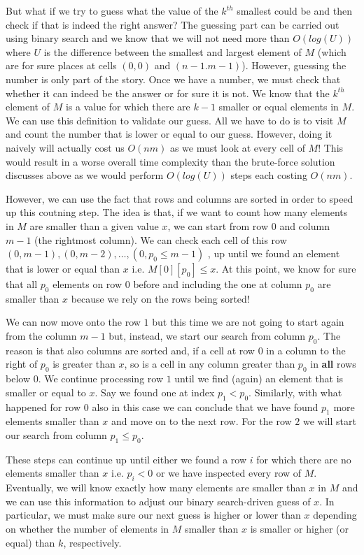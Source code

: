 But what if we try to guess what the value of the $k^{th}$ smallest could be and then check if that is indeed the right answer? The guessing part can be carried out using binary search and we know that we will not need more than $O(log(U))$ where $U$ is the difference between the smallest and largest element of $M$ (which are for sure places at cells $(0,0)$ and $(n-1.m-1)$).
However, guessing the number is only part of the story. Once we have a number, we must check that whether it can indeed be the answer or for sure it is not. 
We know that the $k^{th}$ element of $M$ is a value for which there are $k-1$ smaller or equal elements in $M$. We can use this definition to validate our guess. All we have to do is to visit $M$ and count the number that is lower or equal to our guess. However, doing it naively will actually cost us $O(nm)$ as we must look at every cell of $M$! This would result in a worse overall time complexity than the brute-force solution discusses above as we would perform $O(log(U))$ steps each costing $O(nm)$.

However, we can use the fact that rows and columns are sorted in order to speed up this coutning step.
The idea is that, if we want to count how many elements in $M$ are smaller than a given value $x$, we can start from row $0$ and column $m-1$ (the rightmost column). We can check each cell of this row $(0,m-1),(0,m-2),\ldots,(0,p_0 \leq m-1)$ , up until we found an element that is lower or equal than $x$ i.e. $M[0][p_0] \leq x$. At this point, we know for sure that all $p_0$ elements on row $0$ before and including the one at column $p_0$  are smaller than $x$ because we rely on the rows being sorted!

We can now move onto the row $1$ but this time we are not going to start again from the column $m-1$ but, instead, we start our search from column $p_0$.
 The reason is that also columns are sorted and, if a cell at row $0$ in a column to the right of $p_0$ is greater than $x$, so is a cell in any column greater than $p_0$ in \textbf{all} rows below $0$.
We continue processing row $1$ until we find (again) an element that is smaller or equal to $x$. Say we found one at index $p_1 < p_0$. Similarly, with what happened for row $0$ also in this case we can conclude that we have found $p_1$ more elements smaller than $x$ and move on to the next row. 
For the row $2$ we will start our search from column $p_1 \leq p_0$. 

These steps can continue up until either we found a row $i$ for which there are no elements smaller than $x$ i.e. $p_i < 0$ or we have inspected every row of $M$.
Eventually, we will know exactly how many elements are smaller than $x$ in $M$ and we can use this information to adjust our binary search-driven guess of $x$.
In particular, we must make sure our next guess is higher or lower than $x$ depending on whether the number of elements in $M$ smaller than $x$ is smaller or higher (or equal) than $k$, respectively.

